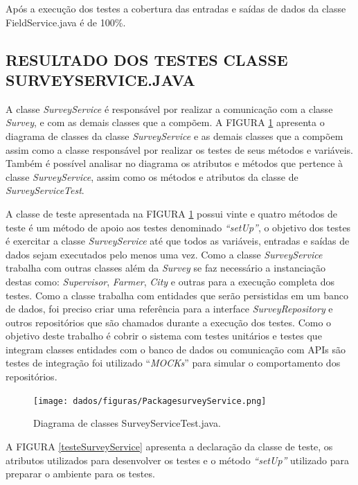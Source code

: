 Após a execução dos testes a cobertura das entradas e saídas de dados da classe FieldService.java é de 100\%.


 \subsection{RESULTADO DOS TESTES CLASSE SURVEYSERVICE.JAVA}

A classe \textit{SurveyService} é responsável por realizar a comunicação com a classe \textit{Survey}, e com as demais classes que a compõem. A FIGURA \ref{packFieldService} apresenta o diagrama de classes da classe \textit{SurveyService} e as demais classes que a compõem assim como a classe responsável por realizar os testes de seus métodos e variáveis. Também é possível analisar no diagrama os atributos e métodos que pertence à classe \textit{SurveyService}, assim como os métodos e atributos da classe de \textit{SurveyServiceTest}.  


A classe de teste apresentada na FIGURA \ref{packFieldService} possui vinte e quatro métodos de teste é um método de apoio aos testes denominado \textit{“setUp”}, o objetivo dos testes é exercitar a classe \textit{SurveyService} até que todos as variáveis, entradas e saídas de dados sejam executados pelo menos uma vez. Como a classe \textit{SurveyService} trabalha com outras classes além da \textit{Survey} se faz necessário a instanciação destas como: \textit{Supervisor}, \textit{Farmer}, \textit{City} e outras para a execução completa dos testes. Como a classe trabalha com entidades que serão persistidas em um banco de dados, foi preciso criar uma referência para a interface \textit{SurveyRepository} e outros repositórios que são chamados durante a execução dos testes. Como o objetivo deste trabalho é cobrir o sistema com testes unitários e testes que integram classes entidades com o banco de dados ou comunicação com APIs são testes de integração foi utilizado “\textit{MOCKs}” para simular o comportamento dos repositórios.

 \begin{figure}[H]
	\centering
	\texttt{[image: dados/figuras/PackagesurveyService.png]}
	\caption{Diagrama de classes SurveyServiceTest.java.}
	\label{packFieldService}
\end{figure}


A FIGURA \ref{testeSurveyService} apresenta a declaração da classe de teste, os atributos utilizados para desenvolver os testes e o método\textit{ “setUp”} utilizado para preparar o ambiente para os testes.

